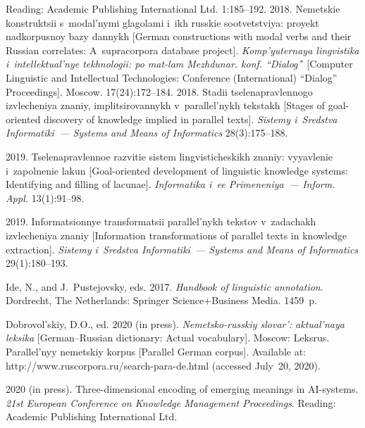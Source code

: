 {\begin{multicols}{2}
{{\begin{thebibliography}{99}
Reading: Academic Publishing International Ltd. 1:185--192.
     2018. Nemetskie 
konstruktsii s~modal'nymi glagolami i~ikh russkie sootvetstviya: proyekt 
nadkorpusnoy bazy dannykh [German constructions with modal verbs and their 
Russian correlates: A~supracorpora database project]. \textit{Komp'yuternaya 
lingvistika i~intellektual'nye tekhnologii: po mat-lam Mezhdunar. konf. ``Dialog'}' 
[Computer Linguistic and Intellectual Technologies: Conference (International) 
``Dialog'' Proceedings]. Moscow. 17(24):172--184.
     2018. Stadii tselenapravlennogo izvlecheniya znaniy, 
implitsirovannykh v~parallel'nykh tekstakh [Stages of goal-oriented discovery of 
knowledge implied in parallel texts]. \textit{Sistemy i~Sredstva Informatiki~--- 
Systems and Means of Informatics} 28(3):175--188.
    
     2019. Tselenapravlennoe razvitie sistem 
lingvisticheskikh znaniy: vyyavlenie i~zapolnenie lakun [Goal-oriented 
development of linguistic knowledge systems: Identifying and filling of lacunae]. 
\textit{Informatika i~ee Primeneniya~--- Inform. Appl.} 13(1):91--98.

     2019. In\-for\-ma\-tsi\-on\-nye 
transformatsii parallel'nykh tekstov v~zadachakh izvlecheniya znaniy [Information 
transformations of parallel texts in knowledge extraction]. \textit{Sistemy i~Sredstva 
Informatiki~--- Systems and Means of Informatics} 29(1):180--193.

    Ide, N., and J.~Pustejovsky, eds. 2017. \textit{Handbook of linguistic 
annotation}. Dordrecht, The Netherlands: Springer Science\;+\;Business Media. 
1459~p.


    Dobrovol'skiy, D.O., ed. 2020 (in press). \textit{Nemetsko-russkiy slovar': 
aktual'naya leksika} [German--Russian dictionary: Actual vocabulary]. Moscow: 
Leksrus. 
    Parallel'nyy nemetskiy korpus [Parallel German corpus]. Available at: {\sf 
http://www.ruscorpora.ru/search-para-de.html} (accessed July~20, 2020).

\pagebreak

     2020 (in press). Three-dimensional encoding of emerging 
meanings in AI-systems. \textit{21st European Conference on Knowledge 
Management Proceedings}. Reading: Academic Publishing International Ltd.
{ %

}
\end{thebibliography}}}
\end{multicols}}
